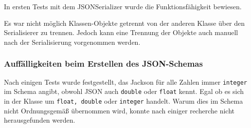 In ersten Tests mit dem JSONSerializer wurde die Funktionsf\"ahigkeit bewiesen. 

Es war nicht m\"oglich Klassen-Objekte getrennt von der anderen Klasse \"uber den Serialisierer zu trennen. Jedoch kann eine Trennung der Objekte auch manuell nach der Serialisierung vorgenommen werden.

\subsubsection{Auff\"alligkeiten beim Erstellen des JSON-Schemas}
Nach einigen Tests wurde festgestellt, das Jackson f\"ur alle Zahlen immer \texttt{integer} im Schema angibt, obwohl JSON auch \texttt{double} oder \texttt{float} kennt. Egal ob es sich in der Klasse um \texttt{float, double} oder  \texttt{integer} handelt. Warum dies im Schema nicht Ordnungsgem\"a\ss{} \"ubernommen wird, konnte nach einiger recherche nicht herausgefunden werden.